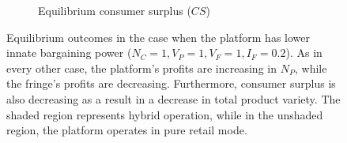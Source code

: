 \documentclass[a4paper]{article}
\begin{document}
\begin{figure}
\begin{subfigure}[b]{0.45\textwidth}
        \caption{Equilibrium consumer surplus ($CS$)}
    \end{subfigure}
    \caption{Equilibrium outcomes in the case when the platform has lower innate bargaining power ($N_C = 1, V_P = 1, V_F = 1, I_F = 0.2$). As in every other case, the platform's profits are increasing in $N_P$, while the fringe's profits are decreasing. Furthermore, consumer surplus is also decreasing as a result in a decrease in total product variety. The shaded region represents hybrid operation, while in the unshaded region, the platform operates in pure retail mode.}
    \label{fig:equilibrium_low_lambda}
\end{figure}
\end{document}
